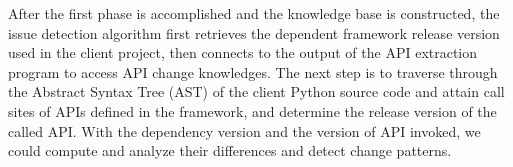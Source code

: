 After the first phase is accomplished and the knowledge base is constructed, the issue detection algorithm first retrieves the dependent framework release version used in the client project, then connects to the output of the API extraction program to access API change knowledges. The next step is to traverse through the Abstract Syntax Tree (AST) of the client Python source code and attain call sites of APIs defined in the framework, and determine the release version of the called API. With the dependency version and the version of API invoked, we could compute and analyze their differences and detect change patterns.
